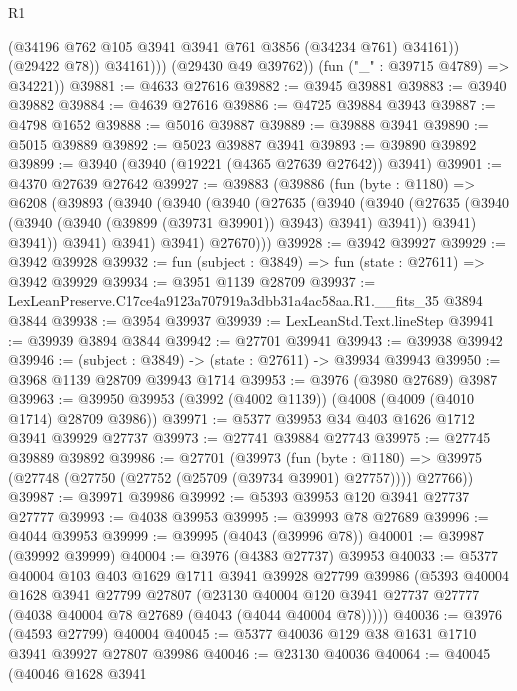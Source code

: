 \begin{lexlean}{R1}
\begin{coremodule}
                  (@34196 @762 @105 @3941 @3941 @761 @3856 (@34234 @761) @34161))
                (@29422 @78))
              @34161)))
        (@29430 @49 @39762))
      (fun ("_" : @39715 @4789) => @34221))
@39881 := @4633 @27616
@39882 := @3945 @39881
@39883 := @3940 @39882
@39884 := @4639 @27616
@39886 := @4725 @39884 @3943
@39887 := @4798 @1652
@39888 := @5016 @39887
@39889 := @39888 @3941
@39890 := @5015 @39889
@39892 := @5023 @39887 @3941
@39893 := @39890 @39892
@39899 := @3940 (@3940 (@19221 (@4365 @27639 @27642)) @3941)
@39901 := @4370 @27639 @27642
@39927 := @39883
    (@39886
      (fun (byte : @1180) =>
      @6208
        (@39893
          (@3940
            (@3940
              (@3940
                (@27635
                  (@3940
                    (@3940
                      (@27635 (@3940 (@3940 (@3940 (@39899 (@39731 @39901)) @3943) @3941) @3941))
                      @3941)
                    @3941))
                @3941)
              @3941)
            @3941)
          @27670)))
@39928 := @3942 @39927
@39929 := @3942 @39928
@39932 := fun (subject : @3849) => fun (state : @27611) => @3942 @39929
@39934 := @3951 @1139 @28709
@39937 := LexLeanPreserve.C17ce4a9123a707919a3dbb31a4ac58aa.R1.__fits_35 @3894 @3844
@39938 := @3954 @39937
@39939 := LexLeanStd.Text.lineStep
@39941 := @39939 @3894 @3844
@39942 := @27701 @39941
@39943 := @39938 @39942
@39946 := (subject : @3849) -> (state : @27611) -> @39934 @39943
@39950 := @3968 @1139 @28709 @39943 @1714
@39953 := @3976 (@3980 @27689) @3987
@39963 := @39950 @39953 (@3992 (@4002 @1139)) (@4008 (@4009 (@4010 @1714) @28709 @3986))
@39971 := @5377 @39953 @34 @403 @1626 @1712 @3941 @39929 @27737
@39973 := @27741 @39884 @27743
@39975 := @27745 @39889 @39892
@39986 := @27701
    (@39973
      (fun (byte : @1180) =>
      @39975 (@27748 (@27750 (@27752 (@25709 (@39734 @39901) @27757)))) @27766))
@39987 := @39971 @39986
@39992 := @5393 @39953 @120 @3941 @27737 @27777
@39993 := @4038 @39953
@39995 := @39993 @78 @27689
@39996 := @4044 @39953
@39999 := @39995 (@4043 (@39996 @78))
@40001 := @39987 (@39992 @39999)
@40004 := @3976 (@4383 @27737) @39953
@40033 := @5377
    @40004
    @103
    @403
    @1629
    @1711
    @3941
    @39928
    @27799
    @39986
    (@5393
      @40004
      @1628
      @3941
      @27799
      @27807
      (@23130 @40004 @120 @3941 @27737 @27777 (@4038 @40004 @78 @27689 (@4043 (@4044 @40004 @78)))))
@40036 := @3976 (@4593 @27799) @40004
@40045 := @5377 @40036 @129 @38 @1631 @1710 @3941 @39927 @27807 @39986
@40046 := @23130 @40036
@40064 := @40045
    (@40046
      @1628
      @3941

\end{coremodule}
\end{lexlean}
